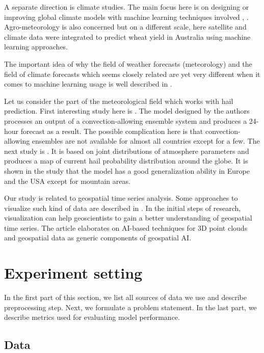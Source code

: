 \documentclass[conference]{IEEEtran}
\begin{document}
A separate direction is climate studies. The main focus here is on designing or improving global climate models with machine learning techniques involved \cite{dueben2018challenges}, \cite{brenowitz2020machine}. Agro-meteorology is also concerned \cite{cai2019integrating} but on a different scale, here satellite and climate data were integrated to predict wheat yield in Australia using machine learning approaches.

The important idea of why the field of weather forecasts (meteorology) and the field of climate forecasts which seems closely related are yet very different when it comes to machine learning usage is well described in \cite{watson2021machine}.

Let us consider the part of the meteorological field which works with hail prediction. First interesting study here is \cite{burke2020calibration}. The model designed by the authors processes an output of a convection-allowing ensemble system and produces a 24-hour forecast as a result. The possible complication here is that convection-allowing ensembles are not available for almost all countries except for a few. 
The next study is \cite{PREIN201810}. It is based on joint distributions of atmosphere parameters and produces a map of current hail probability distribution around the globe. It is shown in the study that the model has a good generalization ability in Europe and the USA except for mountain areas. 

Our study is related to geospatial time series analysis. Some  approaches to visualize such kind of data are described in \cite{kothur2014interactive}. In the initial steps of research, visualization can help geoscientists to gain a better understanding of geospatial time series. The article \cite{dollner2020geospatial} elaborates on AI-based techniques for 3D point clouds and geospatial data as generic components of geospatial AI. 


\section{Experiment setting}
In the first part of this section, we list all sources of data we use and describe preprocessing step. Next, we formulate a problem statement. In the last part, we describe metrics used for evaluating model performance.
\subsection{Data}
\end{document}
